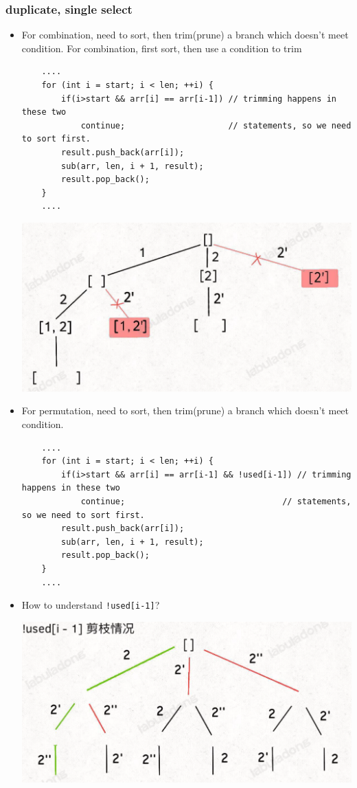 \documentclass[a4paper,11pt,twoside]{book}
\begin{document}
\subsubsection{duplicate, single select}
\begin{itemize}
	
	\item For combination, need to sort, then trim(prune) a branch which doesn't meet condition. For combination, first sort, then use a condition to trim
\begin{lstlisting}
	....
	for (int i = start; i < len; ++i) {
		if(i>start && arr[i] == arr[i-1]) // trimming happens in these two 
			continue;                     // statements, so we need to sort first. 
		result.push_back(arr[i]);  
		sub(arr, len, i + 1, result);
		result.pop_back();
	}	
	....
\end{lstlisting}

\begin{center}
	\includegraphics[width=0.7\linewidth]{pics/com_duplicate}
\end{center}
	

	\item For permutation, need to sort, then trim(prune) a branch which doesn't meet condition. 
\begin{lstlisting}
	....
	for (int i = start; i < len; ++i) {
		if(i>start && arr[i] == arr[i-1] && !used[i-1]) // trimming happens in these two 
			continue;                                // statements, so we need to sort first. 
		result.push_back(arr[i]);  
		sub(arr, len, i + 1, result);
		result.pop_back();
	}	
	....
\end{lstlisting}
	\item How to understand \verb|!used[i-1]|? 
	\begin{center}
		\includegraphics[width=0.7\linewidth]{pics/per_duplicate}
	\end{center}
	

\end{itemize}
\end{document}

